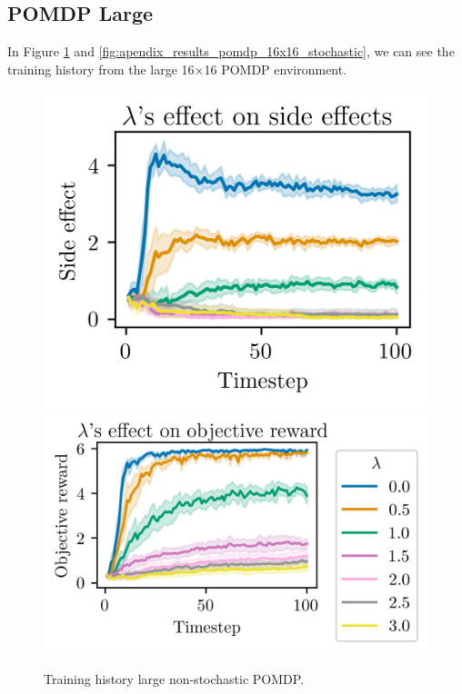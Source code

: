 \documentclass[12pt,A4]{report}
\theoremstyle{definition}
\begin{document}
\begin{appendices}
\section{POMDP Large}
In Figure \ref{fig:apendix_results_pomdp_16x16} and \ref{fig:apendix_results_pomdp_16x16_stochastic}, we can see the training history from the large 16$\times$16 POMDP environment.
\begin{figure}[H]
  \centering
  \includegraphics{"./figures/pomdp_16x16_side_effects.png"}
  \includegraphics{"./figures/pomdp_16x16_objective_reward.png"}
  \caption{Training history large non-stochastic POMDP.}
  \label{fig:apendix_results_pomdp_16x16}
\end{figure}


\end{appendices}
\end{document}
